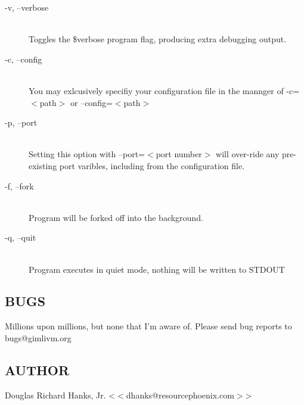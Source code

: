 \begin{description}

\item[-v, --verbose]%
%
\hfil\\
Toggles the \$verbose program flag, producing extra
debugging output.

\item[-c, --config]%
%
\hfil\\
You may exlcusively specifiy your configuration file
in the mannger of -c=$<$path$>$ or --config=$<$path$>$

\item[-p, --port]%
%
\hfil\\
Setting this option with --port=$<$port number$>$ will
over-ride any pre-existing port varibles, including
from the configuration file.

\item[-f, --fork]%
%
\hfil\\
Program will be forked off into the background.

\item[-q, --quit]%
%
\hfil\\
Program executes in quiet mode, nothing will be
written to STDOUT

\end{description}

\subsection*{BUGS}
Millions upon millions, but none that I'm aware of.  Please send bug
reports to bugs@gimlivm.org

\subsection*{AUTHOR}
Douglas Richard Hanks, Jr. <$<$dhanks@resourcephoenix.com$>$>

